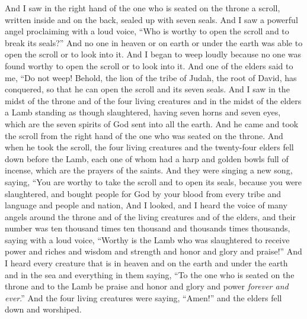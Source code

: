 \begin{biblechapter} %
 And I saw in the right hand of the one who is seated on the throne a scroll, written inside and on the back, sealed up with seven seals.
\verse And I saw a powerful angel proclaiming with a loud voice, “Who is worthy to open the scroll and to break its seals?”
\verse And no one in heaven or on earth or under the earth was able to open the scroll or to look into it.
\verse And I began to weep loudly because no one was found worthy to open the scroll or to look into it.
\verse And one of the elders said to me, “Do not weep! Behold, the lion of the tribe of Judah, the root of David, has conquered, so that he can open the scroll and its seven seals.
\verse And I saw in the midst of the throne and of the four living creatures and in the midst of the elders a Lamb standing as though slaughtered, having seven horns and seven eyes, which are the seven spirits of God sent into all the earth.
\verse And he came and took the scroll from the right hand of the one who was seated on the throne.
\verse And when he took the scroll, the four living creatures and the twenty-four elders fell down before the Lamb, each one of whom had a harp and golden bowls full of incense, which are the prayers of the saints.
\verse And they were singing a new song, saying,
\verse “You are worthy to take the scroll 
and to open its seals, 
because you were slaughtered, 
and bought people for God by your blood 
from every tribe and language and people and nation,
\verse And I looked, and I heard the voice of many angels around the throne and of the living creatures and of the elders, and their number was ten thousand times ten thousand and thousands times thousands,
\verse saying with a loud voice, “Worthy is the Lamb who was slaughtered 
to receive power and riches 
and wisdom and strength 
and honor and glory and praise!”
\verse And I heard every creature that is in heaven and on the earth and under the earth and in the sea and everything in them saying, “To the one who is seated on the throne and to the Lamb 
be praise and honor and glory and power 
\textit{forever and ever}.”
\verse And the four living creatures were saying, “Amen!” and the elders fell down and worshiped.
\end{biblechapter}

